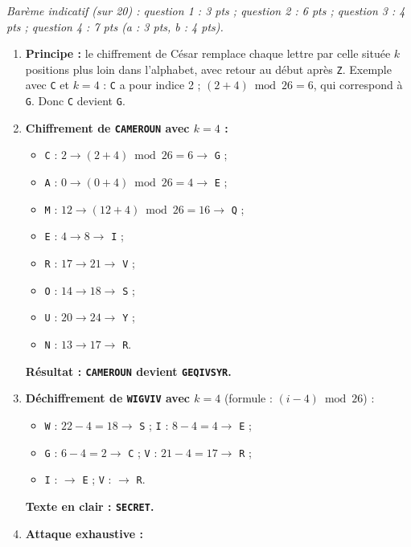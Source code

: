 \documentclass[11pt]{article}
\begin{document}
\begin{corrige}
\emph{Barème indicatif (sur 20) : question 1 : 3 pts ; question 2 : 6 pts ; question 3 : 4 pts ; question 4 : 7 pts (a : 3 pts, b : 4 pts).}
\begin{enumerate}
\item \textbf{Principe :} le chiffrement de César remplace chaque lettre par celle située $k$ positions plus loin dans l'alphabet, avec retour au début après \texttt{Z}. Exemple avec \texttt{C} et $k = 4$ : \texttt{C} a pour indice 2 ; $(2 + 4) \bmod 26 = 6$, qui correspond à \texttt{G}. Donc \texttt{C} devient \texttt{G}.
\item \textbf{Chiffrement de \texttt{CAMEROUN} avec $k = 4$ :}
\begin{itemize}
\item \texttt{C} : $2 \rightarrow (2+4) \bmod 26 = 6 \rightarrow$ \texttt{G} ;
\item \texttt{A} : $0 \rightarrow (0+4) \bmod 26 = 4 \rightarrow$ \texttt{E} ;
\item \texttt{M} : $12 \rightarrow (12+4) \bmod 26 = 16 \rightarrow$ \texttt{Q} ;
\item \texttt{E} : $4 \rightarrow 8 \rightarrow$ \texttt{I} ;
\item \texttt{R} : $17 \rightarrow 21 \rightarrow$ \texttt{V} ;
\item \texttt{O} : $14 \rightarrow 18 \rightarrow$ \texttt{S} ;
\item \texttt{U} : $20 \rightarrow 24 \rightarrow$ \texttt{Y} ;
\item \texttt{N} : $13 \rightarrow 17 \rightarrow$ \texttt{R}.
\end{itemize}
\textbf{Résultat : \texttt{CAMEROUN} devient \texttt{GEQIVSYR}.}
\item \textbf{Déchiffrement de \texttt{WIGVIV} avec $k = 4$} (formule : $(i - 4) \bmod 26$) :
\begin{itemize}
\item \texttt{W} : $22 - 4 = 18 \rightarrow$ \texttt{S} ; \quad \texttt{I} : $8 - 4 = 4 \rightarrow$ \texttt{E} ;
\item \texttt{G} : $6 - 4 = 2 \rightarrow$ \texttt{C} ; \quad \texttt{V} : $21 - 4 = 17 \rightarrow$ \texttt{R} ;
\item \texttt{I} : $\rightarrow$ \texttt{E} ; \quad \texttt{V} : $\rightarrow$ \texttt{R}.
\end{itemize}
\textbf{Texte en clair : \texttt{SECRET}.}
\item \textbf{Attaque exhaustive :}

\end{enumerate}
\end{corrige}
\end{document}
